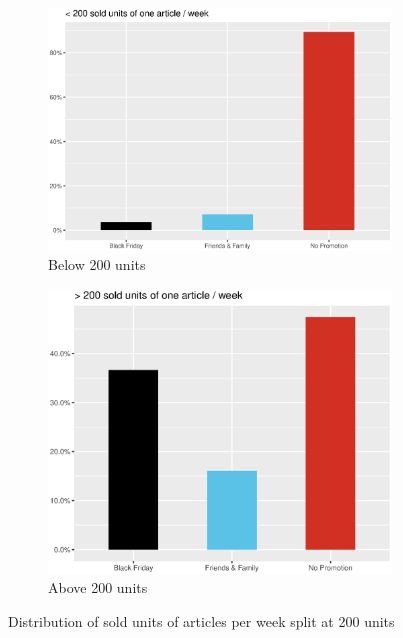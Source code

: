  
 \begin{figure}[H]
\centering
\begin{subfigure}{.45\textwidth}
  \centering
  \includegraphics[width=\linewidth]{figures/bar_below_200_units_week.eps}
  \caption{Below 200 units}
  \label{fig:bar_below_200_units_week}
\end{subfigure}
\begin{subfigure}{.45\textwidth}
  \centering
  \includegraphics[width=\linewidth]{figures/bar_above_200_units_week.eps}
  \caption{Above 200 units}
  \label{fig:bar_above_200_units_week}
\end{subfigure}
\caption{Distribution of sold units of articles per week split at 200 units}
\label{fig:200_split_plots}
\end{figure}


